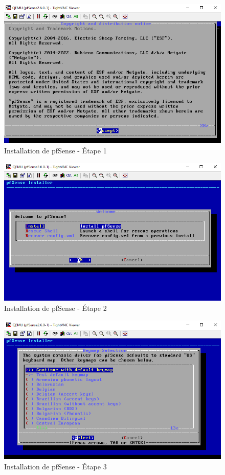\begin{figure}[H]
\centering
\includegraphics[width=15cm]{Images/BRadesMelian-Topologie2.png}
\caption{Installation de pfSense - Étape 1}
\label{Chap3.3.2}
\end{figure}

\begin{figure}[H]
\centering
\includegraphics[width=15cm]{Images/BRadesMelian-Topologie3.png}
\caption{Installation de pfSense - Étape 2}
\label{Chap3.3.3}
\end{figure}

\begin{figure}[H]
\centering
\includegraphics[width=15cm]{Images/BRadesMelian-Topologie4.png}
\caption{Installation de pfSense - Étape 3}
\label{Chap3.3.4}
\end{figure}

